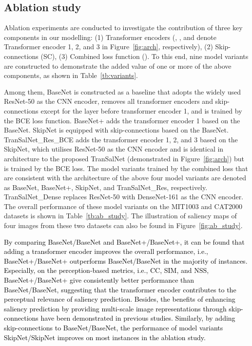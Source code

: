 \documentclass{article}
\begin{document}
\subsection{Ablation study}


Ablation experiments are conducted to investigate the contribution of three key components in our modelling:
(1) Transformer encoders (, , and  denote Transformer encoder 1, 2, and 3 in Figure~\ref{fig:arch}, respectively),
(2) Skip-connections (SC), 
(3) Combined loss function (). To this end, nine model variants are constructed to demonstrate the added value of one or more of the above components, as shown in Table~\ref{tb:variants}.

Among them, BaseNet is constructed as a baseline that adopts the widely used ResNet-50 as the CNN encoder, removes all transformer encoders and skip-connections except for the  layer before transformer encoder 1, and is trained by the BCE loss function. 
BaseNet+ adds the transformer encoder 1 based on the BaseNet.
SkipNet is equipped with skip-connections based on the BaseNet.
TranSalNet\_Res\_BCE adds the transformer encoder 1, 2, and 3 based on the SkipNet, which utilises ResNet-50 as the CNN encoder and is
identical in architecture to the proposed TranSalNet (demonstrated in Figure~\ref{fig:arch}) but is trained by the BCE loss.
The model variants trained by the combined loss that are consistent with the architecture of the above four model variants are denoted as BaseNet, BaseNet+, SkipNet, and TranSalNet\_Res, respectively.
TranSalNet\_Dense replaces ResNet-50 with DenseNet-161 as the CNN encoder.
The overall performance of these model variants on the MIT1003 and CAT2000 datasets is shown in Table~\ref{tb:ab_study}. 
The illustration of saliency maps of four images from these two datasets can also be found in Figure~\ref{fig:ab_study}.




\textcolor{black}{
By comparing BaseNet/BaseNet and BaseNet+/BaseNet+, it can be found that adding a transformer encoder improves the overall performance, i.e., BaseNet+/BaseNet+ outperforms BaseNet/BaseNet in the majority of instances. 
Especially, on the perception-based metrics, i.e., CC, SIM, and NSS, BaseNet+/BaseNet+ give consistently better performance than BaseNet/BaseNet, suggesting that the transformer encoder contributes to the perceptual relevance of saliency prediction.
Besides, the benefits of enhancing saliency prediction by providing multi-scale image representations through skip-connections have been demonstrated in previous studies.
Similarly, by adding skip-connections to BaseNet/BaseNet, the performance of model variants SkipNet/SkipNet improves on most instances in the ablation study. 
}
\end{document}
